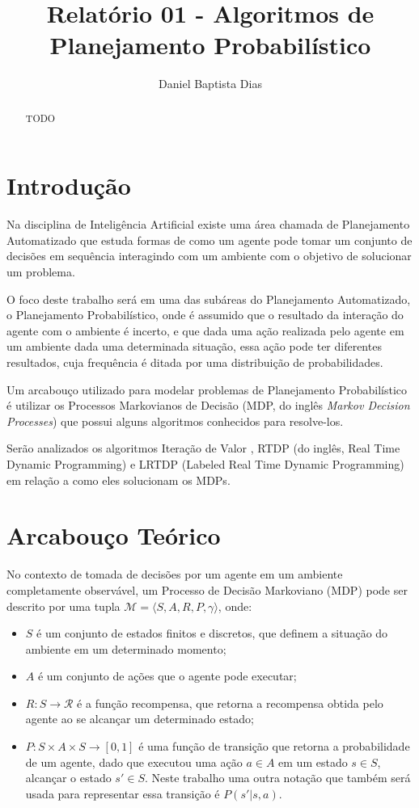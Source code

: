 \documentclass[letterpaper]{article}
\title{Relatório 01 - Algoritmos de Planejamento Probabilístico}
\author{Daniel Baptista Dias}
\begin{document}
\maketitle

\begin{abstract}
TODO
\end{abstract}

\section{Introdução}
\label{sec:introducao}

Na disciplina de Inteligência Artificial existe uma área chamada de Planejamento Automatizado
que estuda formas de como um agente pode tomar um conjunto de decisões em sequência interagindo
com um ambiente com o objetivo de solucionar um problema.

O foco deste trabalho será em uma das subáreas do Planejamento Automatizado, o Planejamento Probabilístico, onde
é assumido que o resultado da interação do agente com o ambiente é incerto, e que dada uma ação realizada pelo agente
em um ambiente dada uma determinada situação, essa ação pode ter diferentes resultados, cuja frequência é ditada por
uma distribuição de probabilidades.

Um arcabouço utilizado para modelar problemas de Planejamento Probabilístico é utilizar os Processos Markovianos de Decisão
(MDP, do inglês \textit{Markov Decision Processes})\cite{Puterman-1994} que possui alguns algoritmos conhecidos para resolve-los.

Serão analizados os algoritmos Iteração de Valor \cite{Howard-1960}, RTDP (do inglês, Real Time Dynamic Programming)
\cite{BartoBradtkeSingh-1995} e LRTDP (Labeled Real Time Dynamic Programming) \cite{BonetGeffer-2003} em relação a como eles
solucionam os MDPs.

\section{Arcabouço Teórico}

No contexto de tomada de decisões por um agente em um ambiente completamente observável, um Processo de Decisão Markoviano (MDP)
pode ser descrito por uma tupla $\mathcal{M}=\langle S,A,R,P,\gamma \rangle$, onde:

\begin{itemize}
    \item $S$ é um conjunto de estados finitos e discretos, que definem a situação do ambiente em um determinado momento;
    \item $A$ é um conjunto de ações que o agente pode executar;
    \item $R : S \rightarrow \mathcal{R} $ é a função recompensa, que retorna a recompensa obtida pelo agente ao se alcançar um determinado estado;
    \item $P : S \times A \times S \rightarrow [0, 1]$ é uma função de transição que retorna a probabilidade de um agente, dado que executou uma ação $a \in A$ em um estado $s \in S$, alcançar o estado $s' \in S$. Neste trabalho uma outra notação que também será usada para representar essa transição é $P(s'|s,a)$.
\end{itemize}
\end{document}
